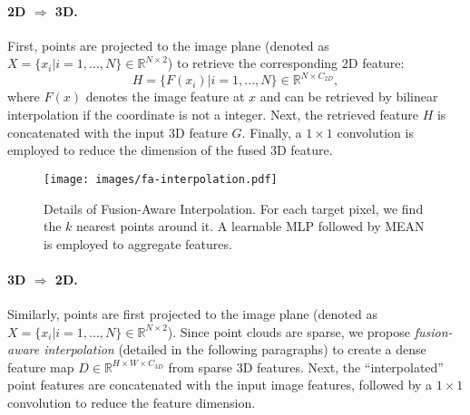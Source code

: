 \documentclass[10pt,twocolumn,letterpaper]{article}
\begin{document}
\vspace{-10pt}
\paragraph{2D $\Rightarrow$ 3D.} First, points are projected to the image plane (denoted as $X = \{ x_i | i = 1, ..., N \} \in \mathbb{R}^{N \times 2}$) to retrieve the corresponding 2D feature:
\begin{equation}
    H = \{ F(x_i) | i = 1, ..., N \} \in \mathbb{R}^{N \times C_{2D}},
\end{equation}
where $F(x)$ denotes the image feature at $x$ and can be retrieved by bilinear interpolation if the coordinate is not a integer. Next, the retrieved feature $H$ is concatenated with the input 3D feature $G$. Finally, a $1 \times 1$ convolution is employed to reduce the dimension of the fused 3D feature.

\begin{figure}[t]
    \centering
    \texttt{[image: images/fa-interpolation.pdf]}
    \vspace{-20pt}
    \caption{Details of Fusion-Aware Interpolation. For each target pixel, we find the $k$ nearest points around it. A learnable MLP followed by MEAN is employed to aggregate features.}
    \vspace{-10pt}
    \label{fig:fa-interpolation}
\end{figure}

\vspace{-10pt}
\paragraph{3D $\Rightarrow$ 2D.} Similarly, points are first projected to the image plane (denoted as $X = \{ x_i | i = 1, ..., N \} \in \mathbb{R}^{N \times 2}$). Since point clouds are sparse, we propose \textit{fusion-aware interpolation} (detailed in the following paragraphs) to create a dense feature map $D \in \mathbb{R}^{H \times W \times C_{3D}}$ from sparse 3D features. Next, the ``interpolated'' point features are concatenated with the input image features, followed by a $1 \times 1$ convolution to reduce the feature dimension.

\vspace{-10pt}
\end{document}
